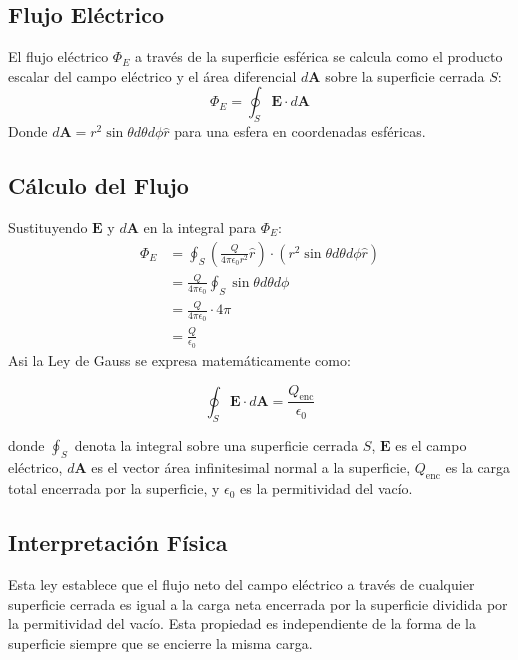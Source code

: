 \documentclass{article}
\begin{document}
\subsection{Flujo Eléctrico}
El flujo eléctrico \( \Phi_E \) a través de la superficie esférica se calcula como el producto escalar del campo eléctrico y el área diferencial \( d\mathbf{A} \) sobre la superficie cerrada \( S \):
\begin{equation}
	\Phi_E = \oint_S \mathbf{E} \cdot d\mathbf{A}
\end{equation}
Donde \( d\mathbf{A} = r^2 \sin\theta d\theta d\phi \hat{r} \) para una esfera en coordenadas esféricas.

\subsection{Cálculo del Flujo}
Sustituyendo \( \mathbf{E} \) y \( d\mathbf{A} \) en la integral para \( \Phi_E \):
\begin{align}
	\Phi_E &= \oint_S \left( \frac{Q}{4\pi \epsilon_0 r^2} \hat{r} \right) \cdot (r^2 \sin\theta d\theta d\phi \hat{r}) \\
	&= \frac{Q}{4\pi \epsilon_0} \oint_S \sin\theta d\theta d\phi \\
	&= \frac{Q}{4\pi \epsilon_0} \cdot 4\pi \\
	&= \frac{Q}{\epsilon_0}
\end{align}
Asi la Ley de Gauss se expresa matemáticamente como:

\begin{equation}
	\oint_S \mathbf{E} \cdot d\mathbf{A} = \frac{Q_{\text{enc}}}{\epsilon_0}
\end{equation}

donde $\oint_S$ denota la integral sobre una superficie cerrada $S$, $\mathbf{E}$ es el campo eléctrico, $d\mathbf{A}$ es el vector área infinitesimal normal a la superficie, $Q_{\text{enc}}$ es la carga total encerrada por la superficie, y $\epsilon_0$ es la permitividad del vacío.

\subsection{Interpretación Física}

Esta ley establece que el flujo neto del campo eléctrico a través de cualquier superficie cerrada es igual a la carga neta encerrada por la superficie dividida por la permitividad del vacío. Esta propiedad es independiente de la forma de la superficie siempre que se encierre la misma carga.
\end{document}
